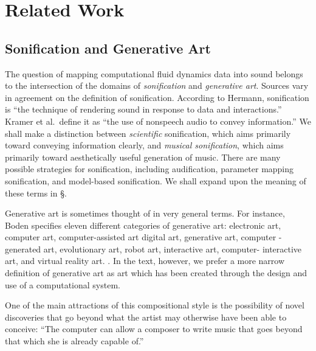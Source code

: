 \chapter[Related Work]{Related Work}
\label{chap:chap2}
\section{Sonification and Generative Art}

The question of mapping computational fluid dynamics data into sound belongs 
to the intersection of the domains of {\em sonification} and {\em generative 
art}. Sources vary in agreement on the definition of sonification. According 
to Hermann, sonification is ``the technique of rendering sound in response to 
data and interactions.'' \cite{hermann2011sonification} Kramer et al.~define 
it as ``the use of nonspeech audio to convey information.'' \cite{kramer2010sonification} 
We shall make a distinction between {\em scientific} 
sonification, which aims primarily toward conveying information clearly, and {
\em musical sonification}, which aims primarily toward aesthetically useful 
generation of music. There are many possible strategies for sonification, 
including audification, parameter mapping sonification, and model-based 
sonification. \cite{hermann2011sonification} We shall expand upon the meaning 
of these terms in \S\cite{sec:background}.

Generative art is sometimes thought of in very general terms. For instance, 
Boden specifies eleven different categories of generative art: electronic 
art, computer art, computer-assisted art digital art, generative art, computer
-generated art, evolutionary art, robot art, interactive art, computer-
interactive art, and virtual reality art. \cite{boden2009generative}. In the 
text, however, we prefer a more narrow definition of generative art as art 
which has been created through the design and use of a computational system.

One of the main attractions of this compositional style is the possibility of 
novel discoveries that go beyond what the artist may otherwise have been able 
to conceive: ``The computer can allow a composer to write music that goes 
beyond that which she is already capable of.'' \cite{roads2015composing}


